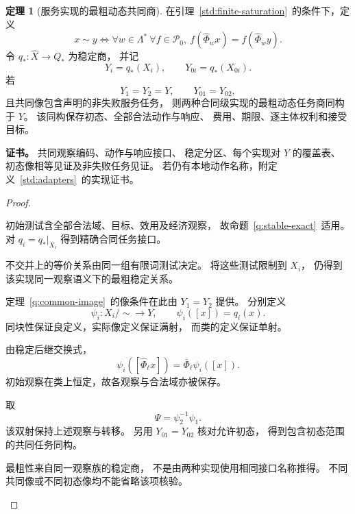 \documentclass[UTF8,12pt,a4paper,openany,fontset=none,zihao=false]{ctexrep}
\theoremstyle{definition}
\newtheorem{theorem}{定理}[chapter]
\newenvironment{certificate}{\par\noindent\textbf{证书。}\ignorespaces}{\par}
\newcommand{\1}{\mathbf 1}
\begin{document}
\begin{theorem}[服务实现的最粗动态共同商]
\label{std:common-task}
在引理~\ref{std:finite-saturation}~的条件下，定义
\[
x\sim y
\Longleftrightarrow
\forall w\in\Lambda^*\ \forall f\in\mathcal P_0,\
f(\widehat\Phi_wx)=f(\widehat\Phi_wy).
\]
令 \(q_*:\widehat X\to Q_*\) 为稳定商，
并记
\[
Y_i=q_*(X_i),\qquad
Y_{0i}=q_*(X_{0i}).
\]
若
\[
Y_1=Y_2=Y,\qquad Y_{01}=Y_{02},
\]
且共同像包含声明的非失败服务任务，
则两种合同级实现的最粗动态任务商同构于 \(Y\)。
该同构保存初态、全部合法动作与响应、
费用、期限、逐主体权利和接受目标。
\end{theorem}
\begin{certificate}
共同观察编码、动作与响应接口、
稳定分区、每个实现对 \(Y\) 的覆盖表、
初态像相等见证及非失败任务见证。
若仍有本地动作名称，附定义~\ref{std:adapters}~的实现证书。
\end{certificate}
\begin{proof}
\begin{semanticsteps}
\item 初始测试含全部合法域、目标、效用及经济观察，
故命题~\ref{q:stable-exact}~适用。
对 \(q_i=q_*|_{X_i}\) 得到精确合同任务接口。
\item 不交并上的等价关系由同一组有限词测试决定。
将这些测试限制到 \(X_i\)，
仍得到该实现同一观察语义下的最粗稳定关系。
\item 定理~\ref{q:common-image}~的像条件在此由
\(Y_1=Y_2\) 提供。
分别定义
\[
\psi_i:X_i/{\sim}\longrightarrow Y,\qquad
\psi_i([x])=q_i(x).
\]
同块性保证良定义，实际像定义保证满射，
而类的定义保证单射。
\item 由稳定后继交换式，
\[
\psi_i([\widehat\Phi_\ell x])
=\bar\Phi_\ell\psi_i([x]).
\]
初始观察在类上恒定，故各观察与合法域亦被保存。
\item 取
\[
\Psi=\psi_2^{-1}\psi_1.
\]
该双射保持上述观察与转移。
另用 \(Y_{01}=Y_{02}\) 核对允许初态，
得到包含初态范围的共同任务同构。
\item 最粗性来自同一观察族的稳定商，
不是由两种实现使用相同接口名称推得。
不同共同像或不同初态像均不能省略该项核验。
\end{semanticsteps}
\end{proof}
\end{document}
